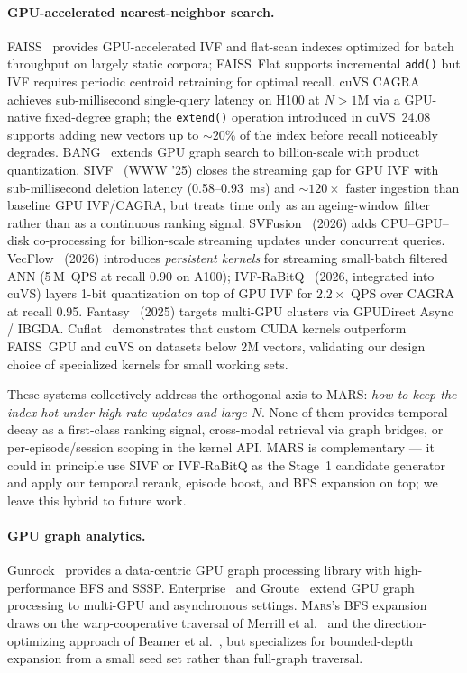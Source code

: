\documentclass[11pt]{article}
\newcommand{\mars}{\textsc{Mars}}
\begin{document}
\paragraph{GPU-accelerated nearest-neighbor search.}
FAISS~\cite{faiss} provides GPU-accelerated IVF and flat-scan indexes
optimized for batch throughput on largely static corpora; FAISS~Flat
supports incremental \texttt{add()} but IVF requires periodic centroid
retraining for optimal recall. cuVS CAGRA~\cite{cuvs} achieves
sub-millisecond single-query latency on H100 at $N > 1$M via a
GPU-native fixed-degree graph; the \texttt{extend()} operation
introduced in cuVS~24.08~\cite{cagra_extend} supports adding new
vectors up to ${\sim}20\%$ of the index before recall noticeably
degrades. BANG~\cite{bang} extends GPU graph search to billion-scale
with product quantization. SIVF~\cite{sivf} (WWW '25) closes the
streaming gap for GPU IVF with sub-millisecond deletion latency
(0.58--0.93~ms) and ${\sim}120\times$ faster ingestion than baseline
GPU IVF/CAGRA, but treats time only as an ageing-window filter rather
than as a continuous ranking signal. SVFusion~\cite{svfusion} (2026)
adds CPU--GPU--disk co-processing for billion-scale streaming updates
under concurrent queries. VecFlow~\cite{vecflow} (2026) introduces
\emph{persistent kernels} for streaming small-batch filtered ANN
(5\,M~QPS at recall 0.90 on A100); IVF-RaBitQ~\cite{ivf_rabitq_gpu}
(2026, integrated into cuVS) layers 1-bit quantization on top of
GPU IVF for ${2.2}\times$ QPS over CAGRA at recall 0.95.
Fantasy~\cite{fantasy_gpudirect} (2025) targets multi-GPU clusters
via GPUDirect Async / IBGDA. Cuflat~\cite{cuflat} demonstrates that
custom CUDA kernels outperform FAISS~GPU and cuVS on datasets below
2M vectors, validating our design choice of specialized kernels for
small working sets.

These systems collectively address the orthogonal axis to MARS:
\emph{how to keep the index hot under high-rate updates and large $N$}.
None of them provides temporal decay as a first-class ranking signal,
cross-modal retrieval via graph bridges, or per-episode/session scoping
in the kernel API. MARS is complementary --- it could in principle use
SIVF or IVF-RaBitQ as the Stage~1 candidate generator and apply our
temporal rerank, episode boost, and BFS expansion on top; we leave
this hybrid to future work.

\paragraph{GPU graph analytics.}
Gunrock~\cite{gunrock} provides a data-centric GPU graph processing
library with high-performance BFS and SSSP. Enterprise~\cite{enterprise}
and Groute~\cite{groute} extend GPU graph processing to multi-GPU and
asynchronous settings. \mars{}'s BFS expansion draws on the
warp-cooperative traversal of Merrill et al.~\cite{merrill2012} and the
direction-optimizing approach of Beamer et al.~\cite{beamer2012}, but
specializes for bounded-depth expansion from a small seed set rather
than full-graph traversal.
\end{document}

